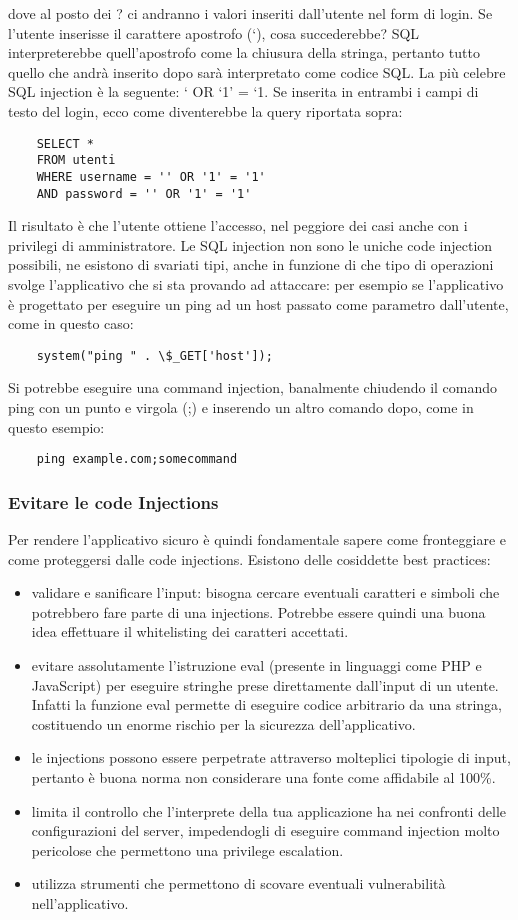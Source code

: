 \documentclass[12pt]{article}
\begin{document}
dove al posto dei ? ci andranno i valori inseriti dall’utente nel form di login.
Se l’utente inserisse il carattere apostrofo (‘), cosa succederebbe? SQL interpreterebbe quell’apostrofo come la chiusura della stringa, pertanto tutto quello che andrà inserito dopo sarà interpretato come codice  SQL.
La più celebre SQL injection è la seguente: ‘ OR ‘1’ = ‘1.
Se inserita in entrambi i campi di testo del login, ecco come diventerebbe la query riportata sopra:
\begin{verbatim}
    SELECT * 
    FROM utenti 
    WHERE username = '' OR '1' = '1'
    AND password = '' OR '1' = '1'
\end{verbatim}
Il risultato è che l’utente ottiene l’accesso, nel peggiore dei casi anche con i privilegi di amministratore.
Le SQL injection non sono le uniche code injection possibili, ne esistono di svariati tipi, anche in funzione di che tipo di operazioni svolge l’applicativo che si sta provando ad attaccare: per esempio se l’applicativo è progettato per eseguire un ping ad un host passato come parametro dall’utente, come in questo caso:
\begin{verbatim}
    system("ping " . \$_GET['host']);
\end{verbatim}
Si potrebbe eseguire una command injection, banalmente chiudendo il comando ping con un punto e virgola (;) e inserendo un altro comando dopo, come in questo esempio:
\begin{verbatim}
    ping example.com;somecommand
\end{verbatim}

\bigskip
\subsubsection{Evitare le code Injections}
Per rendere l’applicativo sicuro è quindi fondamentale sapere come fronteggiare e come proteggersi dalle code injections. Esistono delle cosiddette best practices:
\begin{itemize}
    \item validare e sanificare l’input: bisogna cercare eventuali caratteri e simboli che potrebbero fare parte di una injections. Potrebbe essere quindi una buona idea effettuare il whitelisting dei caratteri accettati.
    \item evitare assolutamente l’istruzione eval (presente in linguaggi come PHP e JavaScript) per eseguire stringhe prese direttamente dall’input di un utente. Infatti la funzione eval permette di eseguire codice arbitrario da una stringa, costituendo un enorme rischio per la sicurezza dell’applicativo.
    \item le injections possono essere perpetrate attraverso molteplici tipologie di input, pertanto è buona norma non considerare una fonte come affidabile al 100\%.
    \item limita il controllo che l’interprete della tua applicazione ha nei confronti delle configurazioni del server, impedendogli di eseguire command injection molto pericolose che permettono una privilege escalation.
    \item utilizza strumenti che permettono di scovare eventuali vulnerabilità nell’applicativo.
\end{itemize}
 
\end{document}
